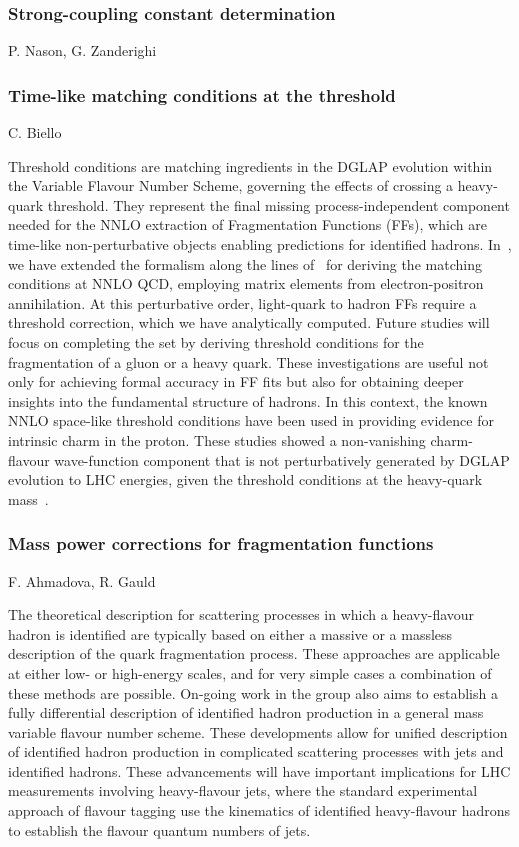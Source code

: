 \documentclass{FBR_Bericht_2025}
\begin{document}
\begin{refsection}
\subsubsection{Strong-coupling constant determination}
\begin{Namen}
P. Nason, G. Zanderighi
\end{Namen}
%
\subsubsection{Time-like matching conditions at the threshold}
\begin{Namen}
C. Biello
\end{Namen}
Threshold conditions are matching ingredients in the DGLAP evolution within the Variable Flavour Number Scheme, governing the effects of crossing a heavy-quark threshold. They represent the final missing process-independent component needed for the NNLO extraction of Fragmentation Functions (FFs), which are time-like non-perturbative objects enabling predictions for identified hadrons. In~, we have extended the formalism along the lines of~ for deriving the matching conditions at NNLO QCD, employing matrix elements from electron-positron annihilation. At this perturbative order, light-quark to hadron FFs require a threshold correction, which we have analytically computed. Future studies will focus on completing the set by deriving threshold conditions for the fragmentation of a gluon or a heavy quark. These investigations are useful not only for achieving formal accuracy in FF fits but also for obtaining deeper insights into the fundamental structure of hadrons. In this context, the known NNLO space-like threshold conditions have been used in providing evidence for intrinsic charm in the proton. These studies showed a non-vanishing charm-flavour wave-function component that is not perturbatively generated by DGLAP evolution to LHC energies, given the threshold conditions at the heavy-quark mass~\cite{Ball:2022qks}.
%
\subsubsection{Mass power corrections for fragmentation functions}
\begin{Namen}
F. Ahmadova, R. Gauld
\end{Namen}
The theoretical description for scattering processes in which a heavy-flavour hadron is identified are typically based on either a massive or a massless description of the quark fragmentation process. These approaches are applicable at either low- or high-energy scales, and for very simple cases a combination of these methods are possible.
On-going work in the group also aims to establish a fully differential description of identified hadron production in a general mass variable flavour number scheme. These developments allow for unified description of identified hadron production in complicated scattering processes with jets and identified hadrons.
These advancements will have important implications for LHC measurements involving heavy-flavour jets, where the standard experimental approach of flavour tagging use the kinematics of identified heavy-flavour hadrons to establish the flavour quantum numbers of jets.
%

\end{refsection}
\end{document}
